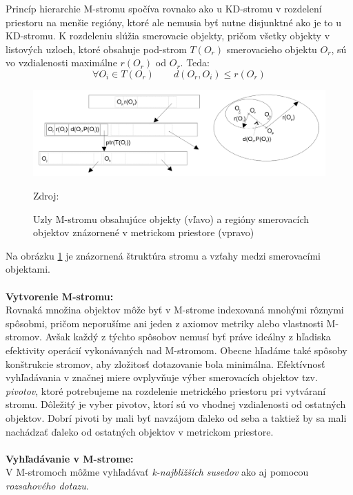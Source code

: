 \documentclass[12pt,a4paper,oneside]{fithesis2}
\begin{document}
Princíp hierarchie M-stromu spočíva rovnako ako u KD-stromu v rozdelení priestoru na menšie regióny, ktoré ale nemusia byť nutne disjunktné ako je to u KD-stromu. K rozdeleniu slúžia smerovacie objekty, pričom všetky objekty v listových uzloch, ktoré obsahuje pod-strom $T(O_r)$ smerovacieho objektu $O_r$, sú vo vzdialenosti maximálne $r(O_r)$ od $O_r$. Teda:
\begin{equation*}
\forall O_i \in T(O_r) \qquad   d(O_r,O_i) \leq r(O_r)
\end{equation*}
\begin{figure}
  		\centering
  		\includegraphics[width=13cm]{obr/m-tree.png}
  		\caption{Uzly M-stromu obsahujúce objekty (vľavo) a regióny smerovacích objektov znázornené v metrickom priestore (vpravo)} Zdroj: \cite{stromy} 
  		\label{m-strom}
\end{figure}
Na obrázku \ref{m-strom} je znázornená štruktúra stromu a vzťahy medzi smerovacími objektami.\\
\\
\textbf{Vytvorenie M-stromu:}\\
Rovnaká množina objektov môže byť v M-strome indexovaná mnohými rôznymi spôsobmi, pričom neporušíme ani jeden z axiomov metriky alebo vlastnosti M-stromov. Avšak každý z týchto spôsobov nemusí byť práve ideálny z hľadiska efektivity operácií vykonávaných nad M-stromom. Obecne hľadáme také spôsoby konštrukcie stromov, aby zložitosť dotazovanie bola minimálna. Efektívnosť vyhľadávania v značnej miere ovplyvňuje výber smerovacích objektov tzv. \textit{pivotov}, ktoré potrebujeme na rozdelenie metrického priestoru pri vytváraní stromu. Dôležitý je vyber pivotov, ktorí sú vo vhodnej vzdialenosti od ostatných objektov. Dobrí pivoti by mali byť navzájom ďaleko od seba a taktiež by sa mali nachádzať ďaleko od ostatných objektov v metrickom priestore. \\
\\
\textbf{Vyhľadávanie v M-strome:}\\
V M-stromoch môžme vyhľadávať \textit{k-najbližších susedov} ako aj pomocou \textit{rozsahového dotazu}. 
\end{document}
